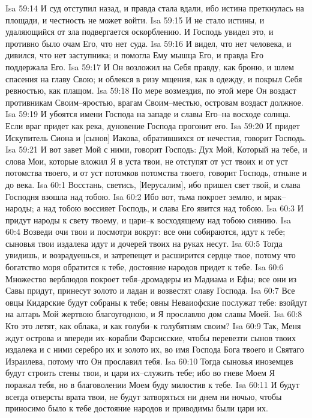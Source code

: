 Isa 59:14  И суд отступил назад, и правда стала вдали, ибо истина преткнулась на площади, и честность не может войти.
Isa 59:15  И не стало истины, и удаляющийся от зла подвергается оскорблению. И Господь увидел это, и противно было очам Его, что нет суда.
Isa 59:16  И видел, что нет человека, и дивился, что нет заступника; и помогла Ему мышца Его, и правда Его поддержала Его.
Isa 59:17  И Он возложил на Себя правду, как броню, и шлем спасения на главу Свою; и облекся в ризу мщения, как в одежду, и покрыл Себя ревностью, как плащом.
Isa 59:18  По мере возмездия, по этой мере Он воздаст противникам Своим--яростью, врагам Своим--местью, островам воздаст должное.
Isa 59:19  И убоятся имени Господа на западе и славы Его--на восходе солнца. Если враг придет как река, дуновение Господа прогонит его.
Isa 59:20  И придет Искупитель Сиона и [сынов] Иакова, обратившихся от нечестия, говорит Господь.
Isa 59:21  И вот завет Мой с ними, говорит Господь: Дух Мой, Который на тебе, и слова Мои, которые вложил Я в уста твои, не отступят от уст твоих и от уст потомства твоего, и от уст потомков потомства твоего, говорит Господь, отныне и до века.
Isa 60:1  Восстань, светись, [Иерусалим], ибо пришел свет твой, и слава Господня взошла над тобою.
Isa 60:2  Ибо вот, тьма покроет землю, и мрак--народы; а над тобою воссияет Господь, и слава Его явится над тобою.
Isa 60:3  И придут народы к свету твоему, и цари--к восходящему над тобою сиянию.
Isa 60:4  Возведи очи твои и посмотри вокруг: все они собираются, идут к тебе; сыновья твои издалека идут и дочерей твоих на руках несут.
Isa 60:5  Тогда увидишь, и возрадуешься, и затрепещет и расширится сердце твое, потому что богатство моря обратится к тебе, достояние народов придет к тебе.
Isa 60:6  Множество верблюдов покроет тебя--дромадеры из Мадиама и Ефы; все они из Савы придут, принесут золото и ладан и возвестят славу Господа.
Isa 60:7  Все овцы Кидарские будут собраны к тебе; овны Неваиофские послужат тебе: взойдут на алтарь Мой жертвою благоугодною, и Я прославлю дом славы Моей.
Isa 60:8  Кто это летят, как облака, и как голуби--к голубятням своим?
Isa 60:9  Так, Меня ждут острова и впереди их--корабли Фарсисские, чтобы перевезти сынов твоих издалека и с ними серебро их и золото их, во имя Господа Бога твоего и Святаго Израилева, потому что Он прославил тебя.
Isa 60:10  Тогда сыновья иноземцев будут строить стены твои, и цари их--служить тебе; ибо во гневе Моем Я поражал тебя, но в благоволении Моем буду милостив к тебе.
Isa 60:11  И будут всегда отверсты врата твои, не будут затворяться ни днем ни ночью, чтобы приносимо было к тебе достояние народов и приводимы были цари их.

